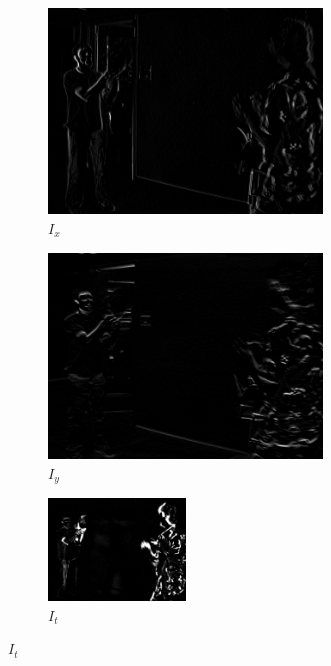 \documentclass[a4paper,11]{article}
\begin{document}
  \begin{figure}
    \begin{subfigure}{0.5\textwidth}
      \centering
      \includegraphics[width=0.8\textwidth]{Basketball/img_x}
      \caption{$I_x$}
    \end{subfigure}
    \begin{subfigure}{0.5\textwidth}
      \centering
      \includegraphics[width=0.8\textwidth]{Basketball/img_y}
      \caption{$I_y$}
    \end{subfigure}
     \begin{subfigure}{\textwidth}
      \centering
      \includegraphics[width=0.4\textwidth]{Basketball/img_t}
      \caption{$I_t$}
    \end{subfigure}
  \end{figure}
\end{document}
